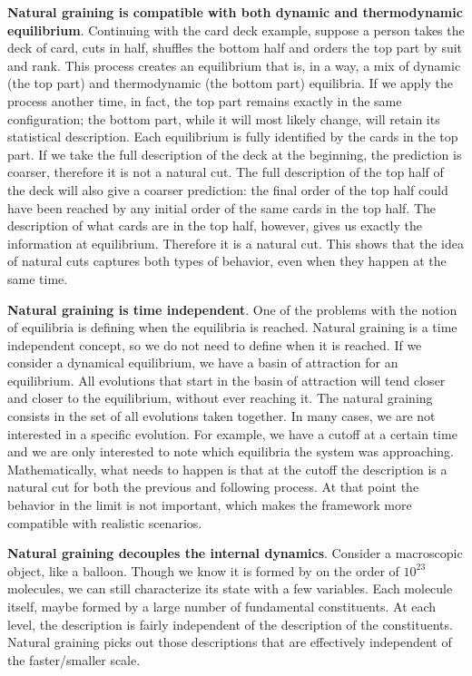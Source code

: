 \documentclass[10pt, onecolumn, longbibliography, nofootinbib]{revtex4-2}
\begin{document}
\textbf{Natural graining is compatible with both dynamic and thermodynamic equilibrium}. Continuing with the card deck example, suppose a person takes the deck of card, cuts in half, shuffles the bottom half and orders the top part by suit and rank. This process creates an equilibrium that is, in a way, a mix of dynamic (the top part) and thermodynamic (the bottom part) equilibria. If we apply the process another time, in fact, the top part remains exactly in the same configuration; the bottom part, while it will most likely change, will retain its statistical description.  Each equilibrium is fully identified by the cards in the top part. If we take the full description of the deck at the beginning, the prediction is coarser, therefore it is not a natural cut. The full description of the top half of the deck will also give a coarser prediction: the final order of the top half could have been reached by any initial order of the same cards in the top half. The description of what cards are in the top half, however, gives us exactly the information at equilibrium. Therefore it is a natural cut. This shows that the idea of natural cuts captures both types of behavior, even when they happen at the same time.

\textbf{Natural graining is time independent}. One of the problems with the notion of equilibria is defining when the equilibria is reached. Natural graining is a time independent concept, so we do not need to define when it is reached. If we consider a dynamical equilibrium, we have a basin of attraction for an equilibrium. All evolutions that start in the basin of attraction will tend closer and closer to the equilibrium, without ever reaching it. The natural graining consists in the set of all evolutions taken together. In many cases, we are not interested in a specific evolution. For example, we have a cutoff at a certain time and we are only interested to note which equilibria the system was approaching. Mathematically, what needs to happen is that at the cutoff the description is a natural cut for both the previous and following process. At that point the behavior in the limit is not important, which makes the framework more compatible with realistic scenarios.

\textbf{Natural graining decouples the internal dynamics}. Consider a macroscopic object, like a balloon. Though we know it is formed by on the order of $10^23$ molecules, we can still characterize its state with a few variables. Each molecule itself, maybe formed by a large number of fundamental constituents. At each level, the description is fairly independent of the description of the constituents. Natural graining picks out those descriptions that are effectively independent of the faster/smaller scale.
\end{document}
